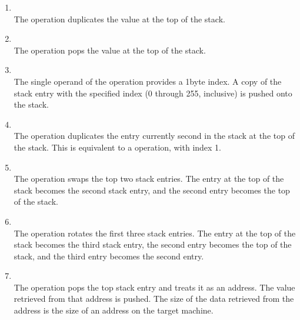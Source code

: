 \begin{enumerate}[1]
\item {} \\
The  operation duplicates the value at the top of the stack.

\item {} \\
The  operation pops the value at the top of the stack.

\item {} \\
The single operand of the  operation provides a
1\dash byte index. A copy of the stack entry with the specified
index (0 through 255, inclusive) is pushed onto the stack.

\item {} \\
The  operation duplicates the entry currently second
in the stack at the top of the stack. 
This is equivalent to
a  operation, with index 1.  

\item {} \\
The  operation swaps the top two stack entries. 
The entry at the top of the
stack becomes the second stack entry, 
and the second entry becomes the top of the stack.

\item {} \\
The  operation rotates the first three stack
entries. The entry at the top of the stack becomes the third
stack entry, the second entry becomes the top of the stack,
and the third entry becomes the second entry.

\item  {} \\
The 
operation 
pops the top stack entry and 
treats it as an address. The value
retrieved from that address is pushed. 
The size of the data retrieved from the 
address is the size of an address on the target machine.


\end{enumerate}
